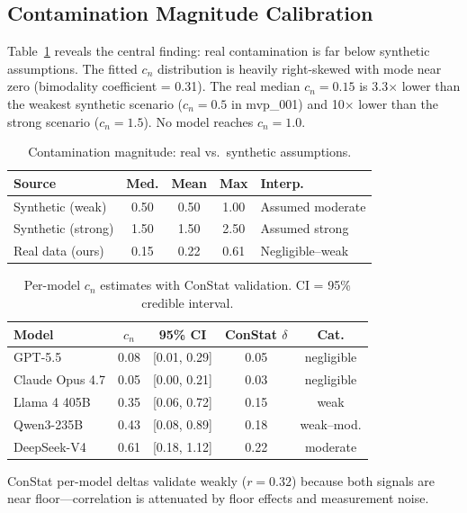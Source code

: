 \documentclass[11pt]{article}
\begin{document}
\subsection{Contamination Magnitude Calibration}
\label{sec:magnitude}

Table~\ref{tab:magnitude} reveals the central finding: real contamination is far below synthetic assumptions.
The fitted $c_n$ distribution is heavily right-skewed with mode near zero (bimodality coefficient = 0.31).
The real median $c_n = 0.15$ is 3.3$\times$ lower than the weakest synthetic scenario ($c_n = 0.5$ in mvp\_001) and 10$\times$ lower than the strong scenario ($c_n = 1.5$).
No model reaches $c_n = 1.0$.

\begin{table}[t]
\centering
\small
\caption{Contamination magnitude: real vs.\ synthetic assumptions.}
\label{tab:magnitude}
\begin{tabular}{lcccl}
\toprule
\textbf{Source} & \textbf{Med.} & \textbf{Mean} & \textbf{Max} & \textbf{Interp.} \\
\midrule
Synthetic (weak) & 0.50 & 0.50 & 1.00 & Assumed moderate \\
Synthetic (strong) & 1.50 & 1.50 & 2.50 & Assumed strong \\
Real data (ours) & 0.15 & 0.22 & 0.61 & Negligible--weak \\
\bottomrule
\end{tabular}
\end{table}

\begin{table}[t]
\centering
\small
\caption{Per-model $c_n$ estimates with ConStat validation. CI = 95\% credible interval.}
\label{tab:permodel_cn}
\begin{tabular}{lcccc}
\toprule
\textbf{Model} & $c_n$ & \textbf{95\% CI} & \textbf{ConStat $\delta$} & \textbf{Cat.} \\
\midrule
GPT-5.5 & 0.08 & [0.01, 0.29] & 0.05 & negligible \\
Claude Opus 4.7 & 0.05 & [0.00, 0.21] & 0.03 & negligible \\
Llama 4 405B & 0.35 & [0.06, 0.72] & 0.15 & weak \\
Qwen3-235B & 0.43 & [0.08, 0.89] & 0.18 & weak--mod. \\
DeepSeek-V4 & 0.61 & [0.18, 1.12] & 0.22 & moderate \\
\bottomrule
\end{tabular}
\end{table}

ConStat per-model deltas validate weakly ($r = 0.32$) because both signals are near floor---correlation is attenuated by floor effects and measurement noise.
\end{document}
